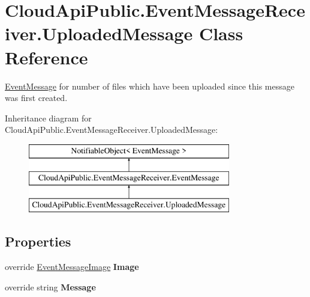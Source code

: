 \hypertarget{class_cloud_api_public_1_1_event_message_receiver_1_1_uploaded_message}{\section{Cloud\-Api\-Public.\-Event\-Message\-Receiver.\-Uploaded\-Message Class Reference}
\label{class_cloud_api_public_1_1_event_message_receiver_1_1_uploaded_message}
}


\hyperlink{class_cloud_api_public_1_1_event_message_receiver_1_1_event_message}{Event\-Message} for number of files which have been uploaded since this message was first created.  


Inheritance diagram for Cloud\-Api\-Public.\-Event\-Message\-Receiver.\-Uploaded\-Message\-:\begin{figure}[H]
\begin{center}
\leavevmode
\includegraphics[height=3.000000cm]{class_cloud_api_public_1_1_event_message_receiver_1_1_uploaded_message}
\end{center}
\end{figure}
\subsection*{Properties}
\begin{DoxyCompactItemize}
\item 
\hypertarget{class_cloud_api_public_1_1_event_message_receiver_1_1_uploaded_message_a4afe03a73873646f46d20239b04e7ed6}{override \hyperlink{namespace_cloud_api_public_1_1_static_aefcc1e7e1c81366ec3f6affd41c1f817}{Event\-Message\-Image} {\bfseries Image}}\label{class_cloud_api_public_1_1_event_message_receiver_1_1_uploaded_message_a4afe03a73873646f46d20239b04e7ed6}

\item 
\hypertarget{class_cloud_api_public_1_1_event_message_receiver_1_1_uploaded_message_a626d529a4027cf478db3c476f20ce3ca}{override string {\bfseries Message}}\label{class_cloud_api_public_1_1_event_message_receiver_1_1_uploaded_message_a626d529a4027cf478db3c476f20ce3ca}

\end{DoxyCompactItemize}

